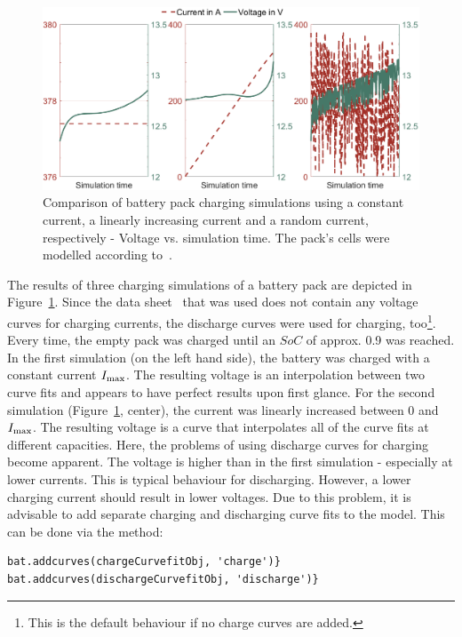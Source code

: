 \begin{figure}[t!]
	\captionsetup{type=figure}
	\centering
	\includegraphics[width=\textwidth]{simulations01}
	\caption[Comparison of battery pack charging simulations using a constant current, a linearly increasing current and a random current, respectively - Voltage vs. simulation time]{Comparison of battery pack charging simulations using a constant current, a linearly increasing current and a random current, respectively - Voltage vs. simulation time. The pack's cells were modelled according to~\cite{_data_2010}.}
	\label{fig:simulations01}
\end{figure}
The results of three charging simulations of a battery pack are depicted in Figure~\ref{fig:simulations01}. Since the data sheet~\cite{_data_2010} that was used does not contain any voltage curves for charging currents, the discharge curves were used for charging, too\footnote{This is the default behaviour if no charge curves are added.}. Every time, the empty pack was charged until an $SoC$ of approx. 0.9 was reached. In the first simulation (on the left hand side), the battery was charged with a constant current $I_\text{max}$. The resulting voltage is an interpolation between two curve fits and appears to have perfect results upon first glance. For the second simulation (Figure~\ref{fig:simulations01}, center), the current was linearly increased between 0 and $I_\text{max}$. The resulting voltage is a curve that interpolates all of the curve fits at different capacities.  Here, the problems of using discharge curves for charging become apparent. The voltage is higher than in the first simulation - especially at lower currents. This is typical behaviour for discharging. However, a lower charging current should result in lower voltages. Due to this problem, it is advisable to add separate charging and discharging curve fits to the model. This can be done via the  method:
\begin{lstlisting}
bat.addcurves(chargeCurvefitObj, 'charge')}
bat.addcurves(dischargeCurvefitObj, 'discharge')}
\end{lstlisting}
